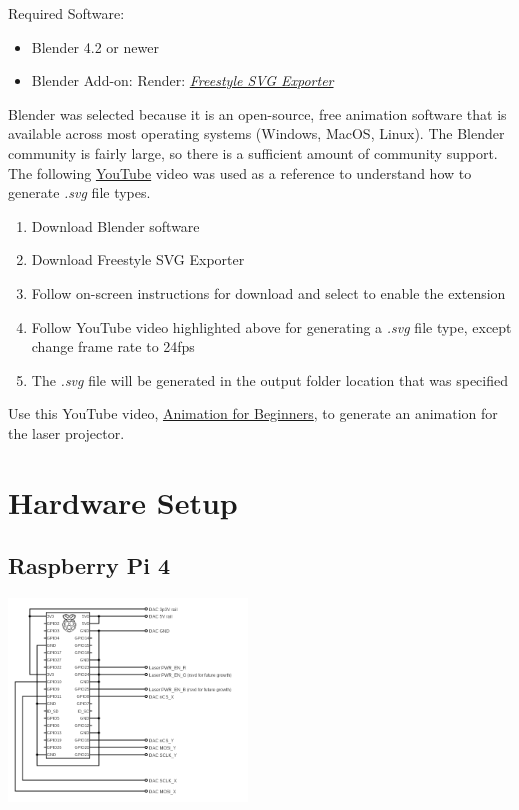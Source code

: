 \documentclass[journal]{IEEEtran}
\begin{document}
    Required Software:
    \begin{itemize}
        \item Blender 4.2 or newer
        \item Blender Add-on: Render: {\href{https://extensions.blender.org/add-ons/freestyle-svg-exporter/}{\emph{Freestyle SVG Exporter}}}
    \end{itemize} 

    Blender was selected because it is an open-source, free animation software that is available across most operating systems (Windows, MacOS, Linux).
    The Blender community is fairly large, so there is a sufficient amount of community support.
    The following {\href{https://youtu.be/PrlK5Y74sR8?si=fridcX0fLfz2cV0W}{YouTube}} video was used as a reference to understand how to generate \emph{.svg} file types. 

    \begin{enumerate}
        \item Download Blender software
        \item Download Freestyle SVG Exporter
        \item Follow on-screen instructions for download and select to enable the extension
        \item Follow YouTube video highlighted above for generating a \emph{.svg} file type, except change frame rate to 24fps
        \item The \emph{.svg} file will be generated in the output folder location that was specified 
    \end{enumerate}

    Use this YouTube video, {\href{https://youtu.be/CBJp82tlR3M?si=AnMmnkilE5h2m_C9}{Animation for Beginners}}, to generate an animation for the laser projector.

    \section{Hardware Setup}
    \subsection{Raspberry Pi 4}

    \includegraphics[width=2.5in]{../artifacts/docs/circuit_diagrams/rpi4_circuit.png}
\end{document}
